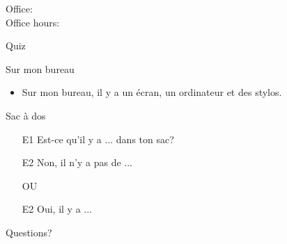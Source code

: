 \documentclass{beamer}
\subtitle[Il y a, c'est, ce sont]{Il y a, c'est, ce sont}
\begin{document}
  \begin{frame}
    \titlepage
    \tiny{Office: \\
          Office hours: }
  \end{frame}

  \begin{frame}{}
    \begin{center}
      \Large Quiz
    \end{center}
  \end{frame}


  \begin{frame}{Sur mon bureau }
    \begin{itemize}
      \item Sur mon bureau, il y a un écran, un ordinateur et des stylos.
    \end{itemize}
  \end{frame}

  \begin{frame}{Sac à dos}
    \begin{itemize}
      \item[E1] Est-ce qu'il y a ... dans ton sac?
      \item[E2] Non, il n'y a pas de ...
      \item[] OU
      \item[E2] Oui, il y a ...
    \end{itemize}
  \end{frame}

  \begin{frame}{}
    \begin{center}
      \Large Questions?
    \end{center}
  \end{frame}
\end{document}
